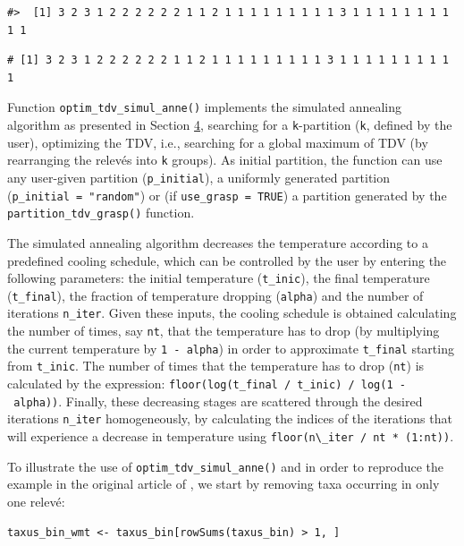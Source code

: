\begin{verbatim}
#>  [1] 3 2 3 1 2 2 2 2 2 2 1 1 2 1 1 1 1 1 1 1 1 1 3 1 1 1 1 1 1 1 1 1 1
\end{verbatim}

\begin{verbatim}
# [1] 3 2 3 1 2 2 2 2 2 2 1 1 2 1 1 1 1 1 1 1 1 1 3 1 1 1 1 1 1 1 1 1 1
\end{verbatim}

Function \texttt{optim\_tdv\_simul\_anne()} implements the simulated annealing algorithm as presented in Section \hyperref[SA]{4}, searching for a \texttt{k}-partition (\texttt{k}, defined by the user), optimizing the TDV, i.e., searching for a global maximum of TDV (by rearranging the relevés into \texttt{k} groups). As initial partition, the function can use any user-given partition (\texttt{p\_initial}), a uniformly generated partition (\texttt{p\_initial\ =\ "random"}) or (if \texttt{use\_grasp\ =\ TRUE}) a partition generated by the \texttt{partition\_tdv\_grasp()} function.

The simulated annealing algorithm decreases the temperature according to a predefined cooling schedule, which can be controlled by the user by entering the following parameters: the initial temperature (\texttt{t\_inic}), the final temperature (\texttt{t\_final}), the fraction of temperature dropping (\texttt{alpha}) and the number of iterations \texttt{n\_iter}. Given these inputs, the cooling schedule is obtained calculating the number of times, say \texttt{nt}, that the temperature has to drop (by multiplying the current temperature by \texttt{1\ -\ alpha}) in order to approximate \texttt{t\_final} starting from \texttt{t\_inic}. The number of times that the temperature has to drop (\texttt{nt}) is calculated by the expression: \texttt{floor(log(t\_final\ /\ t\_inic)\ /\ log(1\ -\ alpha))}. Finally, these decreasing stages are scattered through the desired iterations \texttt{n\_iter} homogeneously, by calculating the indices of the iterations that will experience a decrease in temperature using \texttt{floor(n\textbackslash{}\_iter\ /\ nt\ *\ (1:nt))}.

To illustrate the use of \texttt{optim\_tdv\_simul\_anne()} and in order to reproduce the example in the original article of \citet{PEMCFGFN21}, we start by removing taxa occurring in only one relevé:

\begin{verbatim}
taxus_bin_wmt <- taxus_bin[rowSums(taxus_bin) > 1, ]
\end{verbatim}

